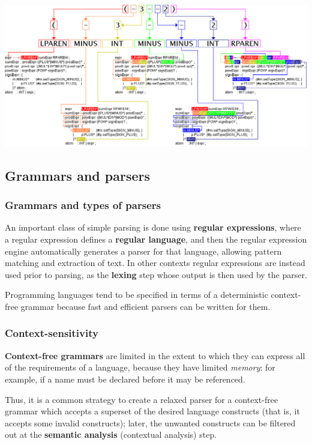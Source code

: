 \documentclass{beamer}
\begin{document}
\begin{frame}
  \begin{center}
    \includegraphics[scale=0.3]{sillyastthing}
  \end{center}
\end{frame}

\subsection{Grammars and parsers}

\begin{frame}
  \frametitle{Grammars and types of parsers}

  An important class of simple parsing is done using \textbf{regular
  expressions}, where a regular expression defines a \textbf{regular language},
  and then the regular expression engine automatically generates a parser for
  that language, allowing pattern matching and extraction of text. In other
  contexts regular expressions are instead used prior to parsing, as the
  \textbf{lexing} step whose output is then used by the parser.

  \vfill

  Programming languages tend to be specified in terms of a deterministic
  context-free grammar because fast and efficient parsers can be written for
  them.
\end{frame}

\begin{frame}
  \frametitle{Context-sensitivity}

  \textbf{Context-free grammars} are limited in the extent to which they can
  express all of the requirements of a language, because they have limited
  \textit{memory}: for example, if a name must be declared before it may be
  referenced.

  \vfill

  Thus, it is a common strategy to create a relaxed parser for a context-free
  grammar which accepts a superset of the desired language constructs (that is,
  it accepts some invalid constructs); later, the unwanted constructs can be
  filtered out at the \textbf{semantic analysis} (contextual analysis) step.
\end{frame}
\end{document}
